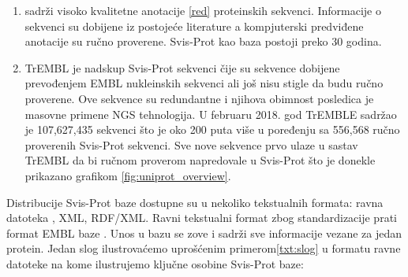 \begin{enumerate}
  \item {}  sadrži visoko kvalitetne anotacije
    \ref{red} proteinskih sekvenci.
    Informacije o sekvenci su dobijene iz postojeće literature a kompjuterski
    predviđene anotacije su ručno proverene. Svis-Prot kao baza postoji preko
    30 godina.

  \item TrEMBL  je nadskup Svis-Prot sekvenci čije su
    sekvence dobijene prevođenjem EMBL nukleinskih sekvenci ali još nisu stigle
    da budu ručno  proverene. Ove sekvence su redundantne i njihova obimnost
    posledica je masovne primene NGS tehnologija. U februaru 2018. god TrEMBLE
    sadržao je 107,627,435 sekvenci što je oko 200 puta više u poređenju sa
    556,568 ručno proverenih Svis-Prot sekvenci. Sve nove sekvence prvo ulaze u
    sastav TrEMBL da bi ručnom proverom napredovale u Svis-Prot što je donekle
    prikazano grafikom \ref{fig:uniprot_overview}.
\end{enumerate}





Distribucije Svis-Prot baze dostupne su u nekoliko tekstualnih formata: ravna
datoteka , XML, RDF/XML.  Ravni tekstualni format zbog
standardizacije prati format EMBL\parencite{embl} baze
\parencite{svisprot2003}.  Unos u bazu se zove   i
sadrži sve informacije vezane za jedan protein. Jedan slog ilustrovaćemo
uprošćenim primerom\ref{txt:slog} u formatu ravne datoteke na kome ilustrujemo
ključne osobine Svis-Prot baze:


